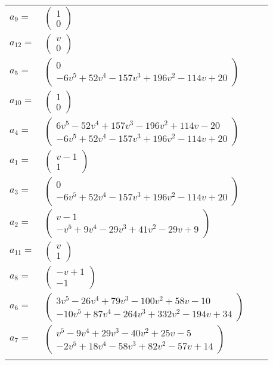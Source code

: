 \documentclass[1p]{elsarticle_modified}
\theoremstyle{definition}
\begin{document}
\begin{tabular}{m{7pt} m{180pt} m{7pt} m{180pt} }
\flushright $a_{9}=$&$\begin{pmatrix}1\\0\end{pmatrix}$ \\
\flushright $a_{12}=$&$\begin{pmatrix}v\\0\end{pmatrix}$ \\
\flushright $a_{5}=$&$\begin{pmatrix}0\\-6 v^5+52 v^4-157 v^3+196 v^2-114 v+20\end{pmatrix}$ \\
\flushright $a_{10}=$&$\begin{pmatrix}1\\0\end{pmatrix}$ \\
\flushright $a_{4}=$&$\begin{pmatrix}6 v^5-52 v^4+157 v^3-196 v^2+114 v-20\\-6 v^5+52 v^4-157 v^3+196 v^2-114 v+20\end{pmatrix}$ \\
\flushright $a_{1}=$&$\begin{pmatrix}v-1\\1\end{pmatrix}$ \\
\flushright $a_{3}=$&$\begin{pmatrix}0\\-6 v^5+52 v^4-157 v^3+196 v^2-114 v+20\end{pmatrix}$ \\
\flushright $a_{2}=$&$\begin{pmatrix}v-1\\- v^5+9 v^4-29 v^3+41 v^2-29 v+9\end{pmatrix}$ \\
\flushright $a_{11}=$&$\begin{pmatrix}v\\1\end{pmatrix}$ \\
\flushright $a_{8}=$&$\begin{pmatrix}- v+1\\-1\end{pmatrix}$ \\
\flushright $a_{6}=$&$\begin{pmatrix}3 v^5-26 v^4+79 v^3-100 v^2+58 v-10\\-10 v^5+87 v^4-264 v^3+332 v^2-194 v+34\end{pmatrix}$ \\
\flushright $a_{7}=$&$\begin{pmatrix}v^5-9 v^4+29 v^3-40 v^2+25 v-5\\-2 v^5+18 v^4-58 v^3+82 v^2-57 v+14\end{pmatrix}$\\&\end{tabular}
\end{document}
